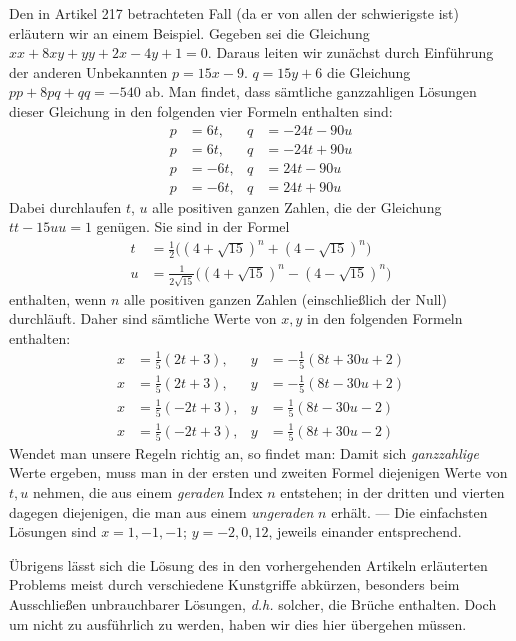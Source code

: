 Den in Artikel 217 betrachteten Fall (da er von allen der schwierigste ist) erläutern wir an einem Beispiel. Gegeben sei die Gleichung $xx+8xy+yy+2x-4y+1=0$. Daraus leiten wir zunächst durch Einführung der anderen Unbekannten $p=15x-9$. $q=15y+6$ die Gleichung $pp+8pq+qq=-540$ ab. Man findet, dass sämtliche ganzzahligen Lösungen dieser Gleichung in den folgenden vier Formeln enthalten sind:
\[
\begin{aligned}
p&=6t,&q&=-24t-90u\\
p&=6t,&q&=-24t+90u\\
p&=-6t,&q&=24t-90u\\
p&=-6t,&q&=24t+90u
\end{aligned}
\]
Dabei durchlaufen $t$, $u$ alle positiven ganzen Zahlen, die der Gleichung
$tt-15uu=1$ genügen. Sie sind in der Formel
\[
\begin{aligned}
t&=\tfrac{1}{2}\bigl((4+\sqrt{15})^n+(4-\sqrt{15})^n\bigr)\\
u&=\frac{1}{2\sqrt{15}}\bigl((4+\sqrt{15})^n-(4-\sqrt{15})^n\bigr)
\end{aligned}
\]
enthalten, wenn $n$ alle positiven ganzen Zahlen (einschließlich der Null) durchläuft. Daher sind sämtliche Werte von $x,y$ in den folgenden Formeln enthalten:
\[
\begin{aligned}
x&=\tfrac{1}{5}(2t+3),&y&=-\tfrac{1}{5}(8t+30u+2)\\
x&=\tfrac{1}{5}(2t+3),&y&=-\tfrac{1}{5}(8t-30u+2)\\
x&=\tfrac{1}{5}(-2t+3),&y&=\tfrac{1}{5}(8t-30u-2)\\
x&=\tfrac{1}{5}(-2t+3),&y&=\tfrac{1}{5}(8t+30u-2)
\end{aligned}
\]
Wendet man unsere Regeln richtig an, so findet man: Damit sich \textit{ganzzahlige} Werte ergeben, muss man in der ersten und zweiten Formel diejenigen Werte von $t,u$ nehmen, die aus einem \textit{geraden} Index $n$ entstehen; in der dritten und vierten dagegen diejenigen, die man aus einem \textit{ungeraden} $n$ erhält. --- Die einfachsten Lösungen sind $x=1,-1,-1$; $y=-2,0,12$, jeweils einander entsprechend.

Übrigens lässt sich die Lösung des in den vorhergehenden Artikeln erläuterten Problems meist durch verschiedene Kunstgriffe abkürzen, besonders beim Ausschließen unbrauchbarer Lösungen, \textit{d.h.} solcher, die Brüche enthalten. Doch um nicht zu ausführlich zu werden, haben wir dies hier übergehen müssen.
